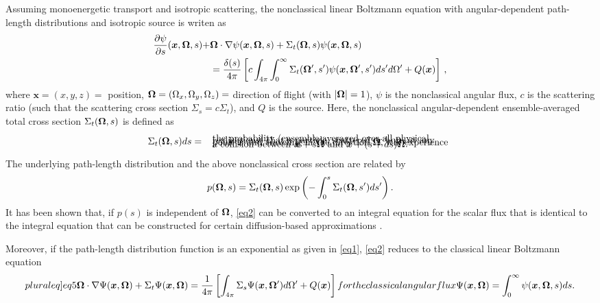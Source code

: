 \documentclass[12pt]{article}
\newcommand{\ux}{{\bm x}}
\newcommand{\uomega}{{\bf \Omega}}
\newcommand{\unabla}{{\bf \nabla}}
\begin{document}
Assuming monoenergetic transport and isotropic scattering, the nonclassical linear Boltzmann equation with angular-dependent path-length distributions and isotropic source is writen as
\begin{align}\label{eq2}
\frac{\partial\psi}{\partial s}(\ux,\uomega,s) + &\uomega\cdot\unabla \psi(\ux,\uomega,s) + \Sigma_t(\uomega,s)\psi(\ux,\uomega,s) 
\\&= \frac{\delta(s)}{4\pi}\left[ c\int_{4\pi}\int_0^\infty \Sigma_t(\uomega',s')\psi(\ux,\uomega',s')ds' d\Omega' + Q(\ux) \right]\,, \nonumber
\end{align}
where $\ux = (x,y,z)=$ position, $\uomega = (\Omega_x,\Omega_y,\Omega_z)=$ direction of flight (with $|\uomega|=1$), $\psi$ is the nonclassical angular flux, $c$ is the scattering ratio (such that the scattering cross section $\Sigma_s= c\Sigma_t$), and $Q$ is the source.
Here, the nonclassical angular-dependent ensemble-averaged total cross section $\Sigma_t(\uomega,s)$ is defined as
\begin{align}\label{eq3}
\Sigma_t(\uomega,s)ds =  \begin{array}{l}
\text{ the probability (ensemble-averaged over all physical}\vspace{-10pt}\\
\text{ realizations) that a particle, scattered or born at any}\vspace{-10pt}\\
\text{ point $\ux$ and traveling in the direction $\uomega$, will experience}\vspace{-10pt}\\
\text{ a collision between $\ux + s\uomega$ and $\ux + (s+ds)\uomega$.}
\end{array}
 \end{align}
The underlying path-length distribution and the above nonclassical cross section are related \cite{vaslar14a} by
\begin{align}\label{eq4}
	p(\uomega,s) = \Sigma_t(\uomega,s)\exp\left( -\int_0^s\Sigma_t(\uomega,s')ds'\right).
\end{align}
It has been shown that, if $p(s)$ is independent of $\uomega$, \cref{eq2} can be converted to an integral equation for the scalar flux that is identical to the integral equation that can be constructed for certain diffusion-based approximations \cite{siap15,vas16}.

Moreover, if the path-length distribution function is an exponential as given in \cref{eq1}, \cref{eq2} reduces to the classical linear Boltzmann equation
\begin{subequations}\label[pluraleq]{eq5}
\begin{align}\label{eq5a}
\uomega\cdot{\unabla} \Psi(\ux,\uomega) + \Sigma_t\Psi(\ux,\uomega) = \frac{1}{4\pi}\left[\int_{4\pi}\Sigma_s\Psi(\ux,\uomega')d\Omega' + Q(\ux) \right]\,
\end{align}
for the classical angular flux 
\begin{align}
\Psi(\ux,\uomega) = \int_0^\infty \psi(\ux,\uomega,s)ds.
\end{align} 
\end{subequations}
\end{document}
